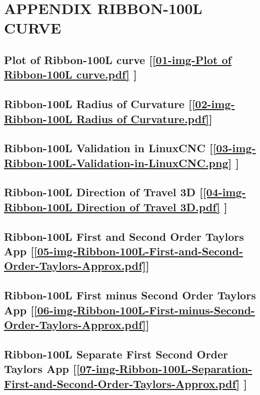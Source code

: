 \section{\textbf{APPENDIX RIBBON-100L CURVE}} \label{APPENDIX RIBBON-100L CURVE}


\subsection       {Plot of Ribbon-100L curve
	[\ref  {01-img-Plot of Ribbon-100L curve.pdf} ] }
\label{ssec-01-img-Plot of Ribbon-100L curve.pdf}

\subsection       {Ribbon-100L Radius of Curvature
	[\ref      {02-img-Ribbon-100L Radius of Curvature.pdf}] }
\label{ssec-02-img-Ribbon-100L Radius of Curvature.pdf}

\subsection       {Ribbon-100L Validation in LinuxCNC
	[\ref      {03-img-Ribbon-100L-Validation-in-LinuxCNC.png} ] }
\label{ssec-03-img-Ribbon-100L-Validation-in-LinuxCNC.png}

\subsection     {Ribbon-100L Direction of Travel 3D
	[\ref      {04-img-Ribbon-100L Direction of Travel 3D.pdf} ] }
\label{ssec-04-img-Ribbon-100L Direction of Travel 3D.pdf}

\subsection       {Ribbon-100L First and Second Order Taylors App
	[\ref      {05-img-Ribbon-100L-First-and-Second-Order-Taylors-Approx.pdf}] }
\label{ssec-05-img-Ribbon-100L-First-and-Second-Order-Taylors-Approx.pdf}

\subsection       {Ribbon-100L First minus Second Order Taylors App
	[\ref      {06-img-Ribbon-100L-First-minus-Second-Order-Taylors-Approx.pdf}] }
\label{ssec-06-img-Ribbon-100L-First-minus-Second-Order-Taylors-Approx.pdf}

\subsection       {Ribbon-100L Separate First Second Order Taylors App
	[\ref      {07-img-Ribbon-100L-Separation-First-and-Second-Order-Taylors-Approx.pdf} ] }
\label{ssec-07-img-Ribbon-100L-Separation-First-and-Second-Order-Taylors-Approx.pdf}

